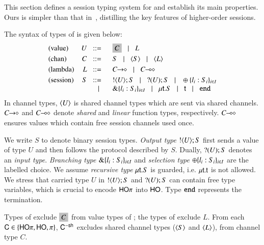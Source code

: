 \noi %
This section defines 
a session typing system for
\HOp and establish its main properties. 
Ours is simpler than that in~\cite{tlca07,mostrous_phd}, distilling the key
features of higher-order sessions. %

\smallskip 

The syntax of types of \HOp is given below: 
\[
\begin{array}{lrl}
\text{(value)}	& U \bnfis &	\nonhosyntax{C} \bnfbar L\\[1mm]  %
\text{(chan)}   & C  \bnfis &	S \bnfbar \chtype{S}\bnfbar \chtype{L}
	\\[1mm]
\text{(lambda)} & L \bnfis &	\shot{C} \bnfbar \lhot{C}
	\\[1mm]
\text{(session)} &  S \bnfis & 	\btout{U} S \bnfbar \btinp{U} S 
\bnfbar \btsel{l_i:S_i}_{i \in I} \\ 
 & \bnfbar & \btbra{l_i:S_i}_{i \in I}
	  \bnfbar  \trec{t}{S} \bnfbar \vart{t}  \bnfbar \tinact
\end{array}
\]
In channel types, $\langle U \rangle$ is shared channel types 
which are sent via shared channels. 
$C\!\! \rightarrow\!\! \diamond$ and $C\!\! \multimap\!\! \diamond$ denote
{\em shared} and {\em linear} function types, respectively.
$C\!\! \multimap\!\! \diamond$ \cite{tlca07,mostrous_phd} ensures values which contain free 
session channels used once. 
 
We write $S$ to denote binary session types.  {\em Output type}
$! \langle U \rangle ; S$ %
first sends a value of
type $U$ and then follows the protocol described by $S$.  Dually,
$? (U) ; S$ denotes an {\em input type}.  {\em Branching type}
$\& \{l_i:S_i\}_{i \in I}$ and {\em selection type}
$\oplus \{l_i:S_i\}_{i \in I}$ are the labelled choice.  We assume {\em recursive
  type} $\mu\mathsf{t}.S$ is guarded, i.e.  $\mu\mathsf{t}.\mathsf{t}$ is not
allowed.  We stress that carried type $U$ in $! \langle U \rangle ; S$ and
$? (U) ; S$ can contain free type variables, which is crucial
to encode $\mathsf{HO}\pi$ into $\mathsf{HO}$. Type $\mathtt{end}$ represents the
termination. 

Types of \HO exclude $\nonhosyntax{C}$ from 
value types of \HOp; the types of \sessp exclude $L$. 
From each $\mathsf{C} \in \{\mathsf{HO}\pi, \mathsf{HO}, \pi \}$, $\mathsf{C}^{-\mathsf{sh}}$ 
excludes shared channel types ($\langle S \rangle$ and $\langle L \rangle$), 
from channel type $C$.

